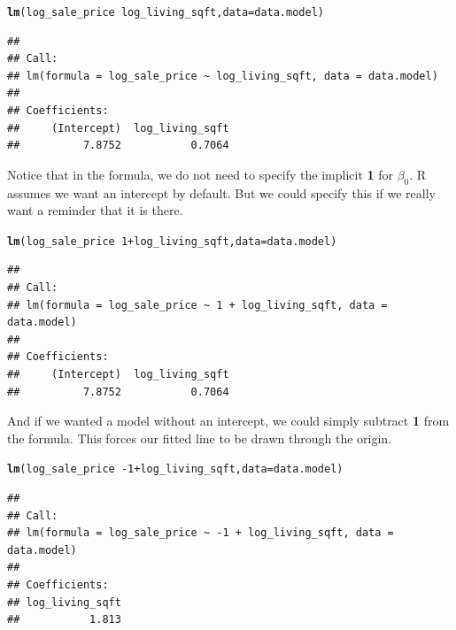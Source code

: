 \documentclass[10pt]{article}\usepackage[]{graphicx}\usepackage[]{color}
\makeatletter
\newcommand{\hlnum}[1]{\textcolor[rgb]{0.686,0.059,0.569}{#1}}%
\newcommand{\hlopt}[1]{\textcolor[rgb]{0,0,0}{#1}}%
\newcommand{\hlstd}[1]{\textcolor[rgb]{0.345,0.345,0.345}{#1}}%
\newcommand{\hlkwc}[1]{\textcolor[rgb]{0.333,0.667,0.333}{#1}}%
\newcommand{\hlkwd}[1]{\textcolor[rgb]{0.737,0.353,0.396}{\textbf{#1}}}%
\newenvironment{kframe}{%
 \def\at@end@of@kframe{}%
 \ifinner\ifhmode%
  \def\at@end@of@kframe{\end{minipage}}%
  \begin{minipage}{\columnwidth}%
 \fi\fi%
 \def\FrameCommand##1{\hskip\@totalleftmargin \hskip-\fboxsep
 \colorbox{shadecolor}{##1}\hskip-\fboxsep
     \hskip-\linewidth \hskip-\@totalleftmargin \hskip\columnwidth}%
 \MakeFramed {\advance\hsize-\width
   \@totalleftmargin\z@ \linewidth\hsize
   \@setminipage}}%
 {\par\unskip\endMakeFramed%
 \at@end@of@kframe}
\newenvironment{knitrout}{}{} %
\makeatother
\begin{document}
\begin{knitrout}\small
{}\color{fgcolor}\begin{kframe}
\begin{alltt}
\hlkwd{lm}\hlstd{(log_sale_price} \hlopt{~} \hlstd{log_living_sqft,} \hlkwc{data}\hlstd{=data.model)}
\end{alltt}
\begin{verbatim}
## 
## Call:
## lm(formula = log_sale_price ~ log_living_sqft, data = data.model)
## 
## Coefficients:
##     (Intercept)  log_living_sqft  
##          7.8752           0.7064
\end{verbatim}
\end{kframe}
\end{knitrout}

Notice that in the formula, we do not need to specify the implicit {\bf 1} for $\beta_0$. R assumes we want an intercept by default. But we could specify this if we really want a reminder that it is there.

\begin{knitrout}\small
{}\color{fgcolor}\begin{kframe}
\begin{alltt}
\hlkwd{lm}\hlstd{(log_sale_price} \hlopt{~} \hlnum{1} \hlopt{+} \hlstd{log_living_sqft,} \hlkwc{data}\hlstd{=data.model)}
\end{alltt}
\begin{verbatim}
## 
## Call:
## lm(formula = log_sale_price ~ 1 + log_living_sqft, data = data.model)
## 
## Coefficients:
##     (Intercept)  log_living_sqft  
##          7.8752           0.7064
\end{verbatim}
\end{kframe}
\end{knitrout}

And if we wanted a model without an intercept, we could simply subtract {\bf 1} from the formula. This forces our fitted line to be drawn through the origin.

\begin{knitrout}\small
{}\color{fgcolor}\begin{kframe}
\begin{alltt}
\hlkwd{lm}\hlstd{(log_sale_price} \hlopt{~ -}\hlnum{1} \hlopt{+} \hlstd{log_living_sqft,} \hlkwc{data}\hlstd{=data.model)}
\end{alltt}
\begin{verbatim}
## 
## Call:
## lm(formula = log_sale_price ~ -1 + log_living_sqft, data = data.model)
## 
## Coefficients:
## log_living_sqft  
##           1.813
\end{verbatim}
\end{kframe}
\end{knitrout}
\end{document}
